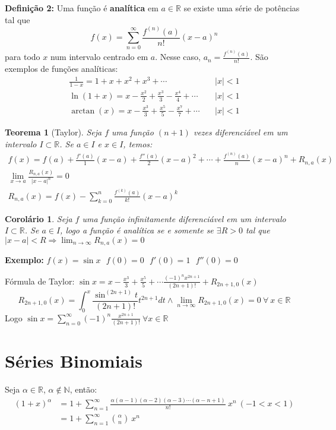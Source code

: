 \documentclass[12pt,openany, letterpaper]{book}
\newtheorem{theorem}{Teorema}[section]
\newtheorem{corollary}{Corolário}[theorem]
\newcommand{\LI}[1][n]{\lim_{{#1} \rightarrow \infty}}
\newcommand{\soma}[2][n]{\sum_{{#1} = #2}^\infty}
\begin{document}
{{\textbf{Definição 2:} Uma função é \textbf{analítica} em $a \in \mathds{R}$ se existe uma série de potências tal que $$f(x) = \soma{0} \frac{f^{(n)}(a)}{n!} (x-a)^n$$ para todo $x$ num intervalo centrado em $a$. Nesse caso, $a_n = \frac{f^{(n)}(a)}{n!}$. São exemplos de funções analíticas: \begin{align*}
\frac{1}{1-x} = 1 + x + x^2 + x^3 + \cdots & \ & |x| < 1 \\
\ln (1+x) = x - \frac{x^2}{2} + \frac{x^3}{3} - \frac{x^4}{4} + \cdots & \ & |x| < 1 \\
\arctan (x) = x - \frac{x^3}{3} + \frac{x^5}{5} - \frac{x^7}{7} + \cdots & \ & |x| < 1
\end{align*}

\begin{theorem}[Taylor]
Seja $f$ uma função $(n+1)$ vezes diferenciável em um intervalo $I \subset \mathds{R}$. Se $a \in I$ e $x \in I$, temos: \begin{align*}
    f(x) = f(a) + \frac{f'(a)}{1}(x-a) + \frac{f''(a)}{2}(x-a)^2 + \cdots + \frac{f^{(n)}(a)}{n}(x-a)^n + R_{n,a}(x) \\
    \lim_{x \rightarrow a} \frac{R_{n,a}(x)}{|x-a|^n}=0 \\
    R_{n,a}(x) = f(x) - \sum_{k=0}^n \frac{f^{(k)}(a)}{k!}(x-a)^k
    \end{align*}
\end{theorem}

\begin{corollary}
Seja $f$ uma função infinitamente diferenciável em um intervalo $I \subset \mathds{R}$. Se $a \in I$, logo a função é analítica se e somente se $\exists R > 0$ tal que $|x-a| < R \Rightarrow \LI R_{n,a} (x) = 0$
\end{corollary}

\textbf{Exemplo:} $f(x) = \sin x \ \ \ f(0) = 0 \ \ \ f'(0) = 1 \ \ \ f''(0) = 0$ 

Fórmula de Taylor: $\displaystyle{\sin x = x - \frac{x^3}{3} + \frac{x^5}{5} + \cdots \frac{(-1)^n x^{2n+1}}{(2n+1)!} + R_{2n+1,0}(x)}$ $$R_{2n+1, 0}(x) = \int_0^x \frac{\sin^{(2n+1)}t}{(2n+1)!}t^{2n+1}dt \land \LI R_{2n+1,0}(x) = 0 \ \forall \ x \in \mathds{R}$$ Logo $\displaystyle{\sin x = \soma{0} (-1)^n \frac{x^{2n+1}}{(2n+1)!}} \ \forall x \in \mathds{R}$

\section{Séries Binomiais}

Seja $\alpha \in \mathds{R}$, $\alpha \notin \mathds{N}$, então: \begin{align*}
(1+x)^\alpha &= 1 + \soma{1} \frac{\alpha(\alpha - 1) (\alpha - 2) (\alpha - 3) \cdots (\alpha -n + 1)}{n!} \ x^n \ (-1 < x < 1) \\
&= 1 + \soma{1} {\alpha \choose n} \ x^n
\end{align*}

}}
\end{document}
